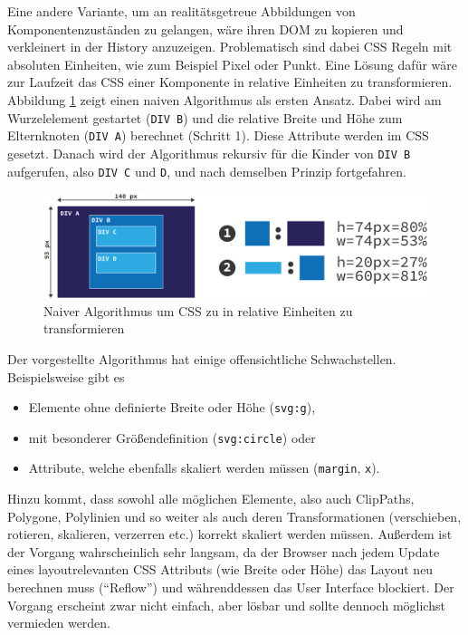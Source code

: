 \documentclass[
	headsepline,
	footsepline,
	fontsize=12pt,
	bibliography=totoc
]{scrbook}
\begin{document}

Eine andere Variante, um an realitätsgetreue Abbildungen von Komponentenzuständen zu gelangen, wäre ihren DOM zu kopieren und verkleinert in der History anzuzeigen. Problematisch sind dabei CSS Regeln mit absoluten Einheiten, wie zum Beispiel Pixel oder Punkt. Eine Lösung dafür wäre zur Laufzeit das CSS einer Komponente in relative Einheiten zu transformieren. Abbildung \ref{figure:transform-css} zeigt  einen naiven Algorithmus als ersten Ansatz. Dabei wird am Wurzelelement gestartet (\texttt{DIV B}) und die relative Breite und Höhe zum Elternknoten (\texttt{DIV A}) berechnet (Schritt 1). Diese Attribute werden im CSS gesetzt. Danach wird der Algorithmus rekursiv für die Kinder von \texttt{DIV B} aufgerufen, also \texttt{DIV C} und \texttt{D}, und nach demselben Prinzip fortgefahren.

\begin{figure}[htbp]
   \centering
   \includegraphics[width=\textwidth]{images/konzeption-transform-css.png}
   \caption{Naiver Algorithmus um CSS zu in relative Einheiten zu transformieren}
   \label{figure:transform-css}
\end{figure}

Der vorgestellte Algorithmus hat einige offensichtliche Schwachstellen. Beispielsweise gibt es 

\begin{itemize}
	\item Elemente ohne definierte Breite oder Höhe (\texttt{svg:g}), 
	\item mit besonderer Größendefinition (\texttt{svg:circle}) oder
	\item Attribute, welche ebenfalls skaliert werden müssen (\texttt{margin}, \texttt{x}).
\end{itemize}

Hinzu kommt, dass sowohl alle möglichen Elemente, also auch ClipPaths, Polygone, Polylinien und so weiter als auch deren Transformationen (verschieben, rotieren, skalieren, verzerren etc.) korrekt skaliert werden müssen. Außerdem ist der Vorgang wahrscheinlich sehr langsam, da der Browser nach jedem Update eines layoutrelevanten CSS Attributs (wie Breite oder Höhe) das Layout neu berechnen muss (\enquote{Reflow}) und währenddessen das User Interface blockiert. Der Vorgang erscheint zwar nicht einfach, aber lösbar und sollte dennoch möglichst vermieden werden.
\end{document}
